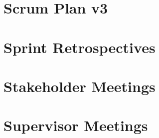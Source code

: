 \documentclass[BSP,english,oneside]{ntnuthesis/ntnubachelorthesis}
\begin{document}
\chapter{Scrum Plan v3}
\label{chap:appendix_scrum_plan_v3}


\chapter{Sprint Retrospectives}
\label{chap:appendix_sprint_retrospectives}






\chapter{Stakeholder Meetings}
\label{chap:appendix_stakeholder_meetings}





\chapter{Supervisor Meetings}
\label{chap:appendix_supervisor_meetings}




\end{document}
